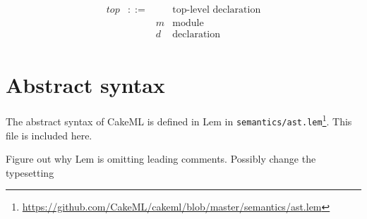 \documentclass[12pt,a4paper]{book}
\newcommand{\TODO}[1]{{\color{red}#1}}
\begin{document}
\[
\begin{array}{lcll}
\mathit{top} &::=& &\mbox{top-level declaration}\\
&& m &\mbox{module}\\
&& d &\mbox{declaration}\\
\end{array}
\]



\section{Abstract syntax}

The abstract syntax of CakeML is defined in Lem in \texttt{semantics/ast.lem}\footnote{\url{https://github.com/CakeML/cakeml/blob/master/semantics/ast.lem}}. This file is included here.

{\setlength{\parindent}{0pt}
\TODO{Figure out why Lem is omitting leading comments. Possibly change the typesetting}


\LEMTypeLit

\LEMTypeOpn

\LEMTypeOpb

\LEMTypeModN


\LEMTypeVarN

\LEMTypeConN

\LEMTypeTypeN

\LEMTypeTvarN





\LEMTypeOp

\LEMTypeLop

\LEMTypeTctor

\LEMTypeT

\LEMTint

\LEMTstring



\LEMTref

\LEMTwordEight

\LEMTwordEightarray

\LEMTfn

\LEMTexn

\LEMTypePat

\LEMTypeExp

\LEMTypeTypeDef

\LEMTypeDec

\LEMTypeDecs

\LEMTypeSpec

\LEMTypeSpecs

\LEMTypeTop

\LEMTypeProg

\LEMValspecPatBindings

\LEMconstZero
}
\end{document}
